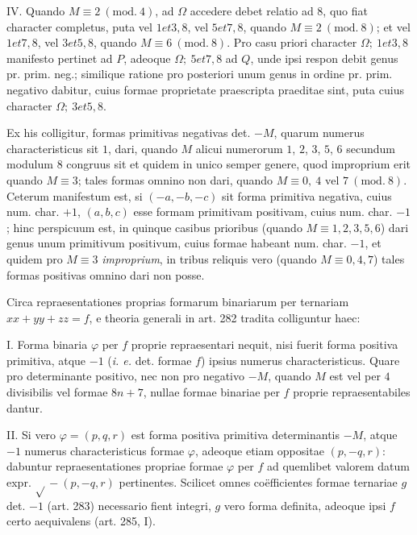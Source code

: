 IV. Quando $M\equiv2\ (\mathrm{mod.}\ 4)$, ad $\Omega$ accedere debet relatio ad $8$, quo fiat character completus, puta vel $1\mathbin{\textit{et}}3,8$, vel $5\mathbin{\textit{et}}7,8$, quando $M\equiv2\ (\mathrm{mod.}\ 8)$; et vel $1\mathbin{\textit{et}}7,8$, vel $3\mathbin{\textit{et}}5,8$, quando $M\equiv6\ (\mathrm{mod.}\ 8)$. Pro casu priori character $\Omega;\ 1\mathbin{\textit{et}}3,\allowbreak 8$ manifesto pertinet ad $P$, adeoque $\Omega;\ 5\mathbin{\textit{et}}7,\allowbreak 8$ ad $Q$, unde ipsi respon%
%
debit genus pr. prim. neg.; similique ratione pro posteriori unum genus in ordine pr. prim. negativo dabitur, cuius formae proprietate praescripta praeditae sint, puta cuius character $\Omega;\ 3\mathbin{\textit{et}}5,\allowbreak 8$.

Ex his colligitur, formas primitivas negativas det. $-M$, quarum numerus characteristicus sit $1$, dari, quando $M$ alicui numerorum $1$, $2$, $3$, $5$, $6$ secundum modulum $8$ congruus sit et quidem in unico semper genere, quod improprium erit quando $M\equiv3$; tales formas omnino non dari, quando $M\equiv0,\allowbreak \ 4\text{ vel }7\ (\mathrm{mod.}\ 8)$. Ceterum manifestum est, si $(-a,-b,-c)$ sit forma primitiva negativa, cuius num. char. $+1$, $(a,b,c)$ esse formam primitivam positivam, cuius num. char. $-1$; hinc perspicuum est, in quinque casibus prioribus (quando $M\equiv1,2,3,5,6$) dari genus unum primitivum positivum, cuius formae habeant num. char. $-1$, et quidem pro $M\equiv3$ \textit{improprium}, in tribus reliquis vero (quando $M\equiv0,4,7$) tales formas positivas omnino dari non posse.

Circa repraesentationes proprias formarum binariarum per ternariam $xx+yy+zz=f$, e theoria generali in art. 282 tradita colliguntur haec:

I. Forma binaria $\varphi$ per $f$ proprie repraesentari nequit, nisi fuerit forma positiva primitiva, atque $-1$ (\textit{i. e.} det. formae $f$) ipsius numerus characteristicus. Quare pro determinante positivo, nec non pro negativo $-M$, quando $M$ est vel per $4$ divisibilis vel formae $8n+7$, nullae formae binariae per $f$ proprie repraesentabiles dantur.

II. Si vero $\varphi=(p,q,r)$ est forma positiva primitiva determinantis $-M$, atque $-1$ numerus characteristicus formae $\varphi$, adeoque etiam oppositae $(p,-q,r)$: dabuntur repraesentationes propriae formae $\varphi$ per $f$ ad quemlibet valorem datum expr. $\surd{}-(p,-q,r)$ pertinentes. Scilicet omnes coëfficientes formae ternariae $g$ det. $-1$ (art. 283) necessario fient integri, $g$ vero forma definita, adeoque ipsi $f$ certo aequivalens (art. 285, I).

